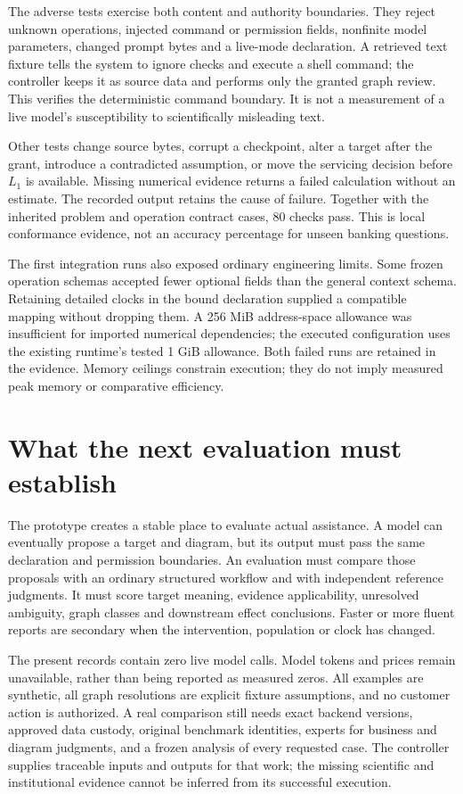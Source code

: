 The adverse tests exercise both content and authority boundaries. They reject
unknown operations, injected command or permission fields, nonfinite model
parameters, changed prompt bytes and a live-mode declaration. A retrieved text
fixture tells the system to ignore checks and execute a shell command; the
controller keeps it as source data and performs only the granted graph review.
This verifies the deterministic command boundary. It is not a measurement of a
live model's susceptibility to scientifically misleading text.

Other tests change source bytes, corrupt a checkpoint, alter a target after
the grant, introduce a contradicted assumption, or move the servicing decision
before $L_1$ is available. Missing numerical evidence returns a failed
calculation without an estimate. The recorded output retains the cause of
failure. Together with the inherited problem and operation contract cases,
80 checks pass. This is local conformance evidence, not an accuracy percentage
for unseen banking questions.

The first integration runs also exposed ordinary engineering limits. Some
frozen operation schemas accepted fewer optional fields than the general context
schema. Retaining detailed clocks in the bound declaration supplied a compatible
mapping without dropping them. A 256 MiB address-space allowance was insufficient
for imported numerical dependencies; the executed configuration uses the
existing runtime's tested 1 GiB allowance. Both failed runs are retained in the
evidence. Memory ceilings constrain execution; they do not imply measured
peak memory or comparative efficiency.

\section{What the next evaluation must establish}

The prototype creates a stable place to evaluate actual assistance. A model can
eventually propose a target and diagram, but its output must pass the same
declaration and permission boundaries. An evaluation must compare those proposals
with an ordinary structured workflow and with independent reference judgments.
It must score target meaning, evidence applicability, unresolved ambiguity,
graph classes and downstream effect conclusions. Faster or more fluent reports
are secondary when the intervention, population or clock has changed.

The present records contain zero live model calls. Model tokens and prices
remain unavailable, rather than being reported as measured zeros. All examples
are synthetic, all graph resolutions are explicit fixture assumptions, and no
customer action is authorized. A real comparison still needs exact backend
versions, approved data custody, original benchmark identities, experts for
business and diagram judgments, and a frozen analysis of every requested case.
The controller supplies traceable inputs and outputs for that work; the missing
scientific and institutional evidence cannot be inferred from its successful
execution.
